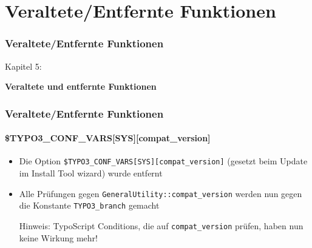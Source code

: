 %

\section{Veraltete/Entfernte Funktionen}
\begin{frame}[fragile]
	\frametitle{Veraltete/Entfernte Funktionen}

	\begin{center}\huge{Kapitel 5:}\end{center}
	\begin{center}\huge{\color{typo3darkgrey}\textbf{Veraltete und entfernte Funktionen}}\end{center}

\end{frame}


\begin{frame}[fragile]
	\frametitle{Veraltete/Entfernte Funktionen}
	\framesubtitle{\$TYPO3\_CONF\_VARS[SYS][compat\_version]}

	\begin{itemize}

		\item Die Option \texttt{\$TYPO3\_CONF\_VARS[SYS][compat\_version]} (gesetzt
			beim Update im Install Tool wizard) wurde entfernt

		\item Alle Prüfungen gegen \texttt{GeneralUtility::compat\_version} werden
			nun gegen die Konstante \texttt{TYPO3\_branch} gemacht

			\vspace{0.2cm}

			\begingroup
				\color{red}
					Hinweis: TypoScript Conditions, die auf \texttt{compat\_version}
					prüfen, haben nun keine Wirkung mehr!
			\endgroup

	\end{itemize}

\end{frame}

